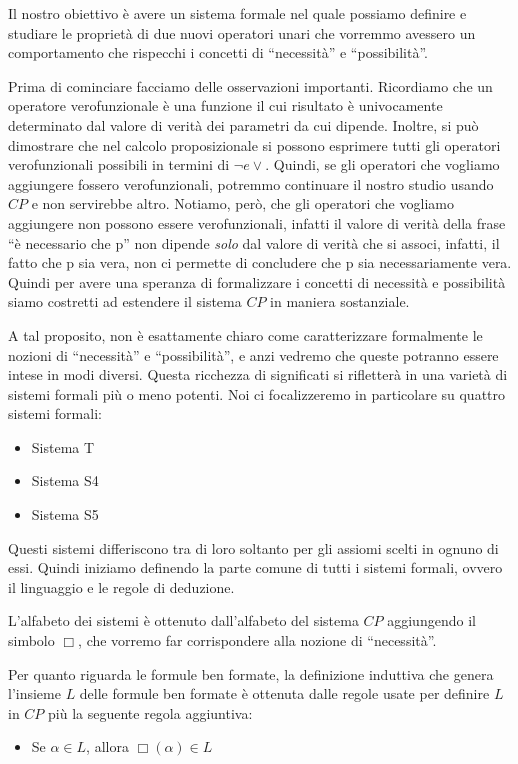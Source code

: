 \documentclass[a4paper, 12pt]{article}
\begin{document}
Il nostro obiettivo è avere un sistema formale nel quale possiamo definire e studiare
le proprietà di due nuovi operatori unari che vorremmo avessero un comportamento che rispecchi
i concetti di ``necessità'' e ``possibilità''.

Prima di cominciare facciamo delle osservazioni importanti.
Ricordiamo che un operatore verofunzionale è una funzione il cui risultato
è univocamente determinato dal valore di verità dei parametri da cui dipende.
Inoltre, si può dimostrare che nel calcolo proposizionale si possono esprimere
tutti gli operatori verofunzionali possibili in termini di $\neg e \vee$.
Quindi, se gli operatori che vogliamo aggiungere fossero verofunzionali, potremmo
continuare il nostro studio usando $CP$ e non servirebbe altro.
Notiamo, però, che gli operatori che vogliamo aggiungere non possono essere verofunzionali,
infatti il valore di verità della frase ``è necessario che p'' non dipende \textit{solo}
dal valore di verità che si associ, infatti, il fatto che p sia vera, non ci permette
di concludere che p sia necessariamente vera. Quindi per avere una speranza di formalizzare
i concetti di necessità e possibilità siamo costretti ad estendere il sistema $CP$
in maniera sostanziale.

A tal proposito, non è esattamente chiaro come caratterizzare formalmente
le nozioni di ``necessità'' e ``possibilità'', e anzi vedremo che queste potranno essere
intese in modi diversi.
Questa ricchezza di significati si rifletterà in una varietà di sistemi formali più o meno potenti.
Noi ci focalizzeremo in particolare su quattro sistemi formali:
\begin{itemize}
\item Sistema T
\item Sistema S4
\item Sistema S5
\end{itemize}

Questi sistemi differiscono tra di loro soltanto per gli assiomi scelti in ognuno di essi.
Quindi iniziamo definendo la parte comune di tutti i sistemi formali, ovvero il linguaggio
e le regole di deduzione.

L'alfabeto dei sistemi è ottenuto dall'alfabeto del sistema $CP$ aggiungendo il simbolo $\Box$,
che vorremo far corrispondere alla nozione di ``necessità''.

Per quanto riguarda le formule ben formate, la definizione induttiva che genera l'insieme $L$
delle formule ben formate è ottenuta dalle regole usate per definire $L$ in $CP$ più
la seguente regola aggiuntiva:
\begin{itemize}
\item Se $\alpha \in L$, allora $\Box (\alpha) \in L$
\end{itemize}
\end{document}
